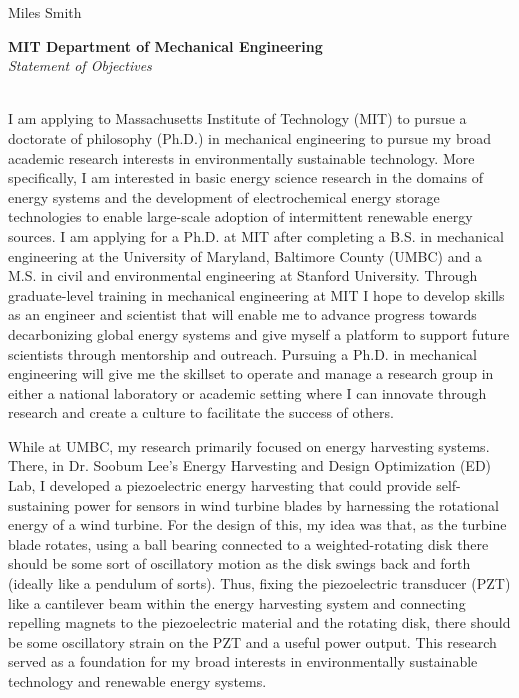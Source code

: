 \documentclass[12pt]{article}
\begin{document}
\begin{flushright}
Miles Smith
\end{flushright}
\begin{center}
\large{\bf MIT Department of Mechanical Engineering\\}
\large{\it Statement of Objectives\\}
\hrulefill \\ 
\end{center}



\par
I am applying to Massachusetts Institute of Technology (MIT) to pursue a doctorate of philosophy (Ph.D.) in mechanical engineering to pursue my broad academic research interests in environmentally sustainable technology. More specifically, I am interested in basic energy science research in the domains of energy systems and the development of electrochemical energy storage technologies to enable large-scale adoption of intermittent renewable energy sources.  I am applying for a Ph.D. at MIT after completing a B.S. in mechanical engineering at the University of Maryland, Baltimore County (UMBC) and a M.S. in civil and environmental engineering at Stanford University.  Through graduate-level training in mechanical engineering at MIT I hope to develop skills as an engineer and scientist that will enable me to advance progress towards decarbonizing global energy systems and give myself a platform to support future scientists through mentorship and outreach.  Pursuing a Ph.D. in mechanical engineering will give me the skillset to operate and manage a research group in either a national laboratory or academic setting where I can innovate through research and create a culture to facilitate the success of others. 

\par
While at UMBC, my research primarily focused on energy harvesting systems. There, in Dr. Soobum Lee's Energy Harvesting and Design Optimization (ED) Lab, I developed a piezoelectric energy harvesting that could provide self-sustaining power for sensors in wind turbine blades by harnessing the rotational energy of a wind turbine. For the design of this, my idea was that, as the turbine blade rotates, using a ball bearing connected to a weighted-rotating disk there should be some sort of oscillatory motion as the disk swings back and forth (ideally like a pendulum of sorts). Thus, fixing the piezoelectric transducer (PZT) like a cantilever beam within the energy harvesting system and connecting repelling magnets to the piezoelectric material and the rotating disk, there should be some oscillatory strain on the PZT and a useful power output. This research served as a foundation for my broad interests in environmentally sustainable technology and renewable energy systems. 
\end{document}
